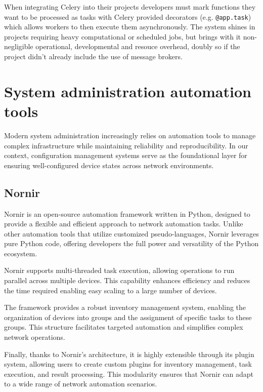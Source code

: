     When integrating Celery into their projects developers must mark functions they want to be processed as tasks with Celery provided 
    decorators (e.g. \texttt{@app.task}) which allows workers to then execute them asynchronously. The system shines in projects requiring 
    heavy computational or scheduled jobs, but brings with it non-negligible operational, developmental and resouce overhead, doubly so if 
    the project didn't already include the use of message brokers.

\section{System administration automation tools}

  Modern system administration increasingly relies on automation tools to manage complex infrastructure while maintaining reliability and 
  reproducibility. In our context, configuration management systems serve as the foundational layer for ensuring well-configured device states 
  across network environments.

  \subsection{Nornir}
  
    Nornir is an open-source automation framework written in Python, designed to provide a flexible and efficient 
    approach to network automation tasks\cite{nornir2025}. Unlike other automation tools that utilize customized 
    pseudo-languages, Nornir leverages pure Python code, offering developers the full power and versatility of the Python 
    ecosystem.

    Nornir supports multi-threaded task execution, allowing operations to run parallel across multiple devices.
    This capability enhances efficiency and reduces the time required enabling easy scaling to a large number of devices.

    The framework provides a robust inventory management system, enabling the organization of devices into groups and the 
    assignment of specific tasks to these groups. This structure facilitates targeted automation and simplifies complex 
    network operations.

    Finally, thanks to Nornir's architecture, it is highly extensible through its plugin system, allowing users to create 
    custom plugins for inventory management, task execution, and result processing. This modularity ensures that Nornir can 
    adapt to a wide range of network automation scenarios.


